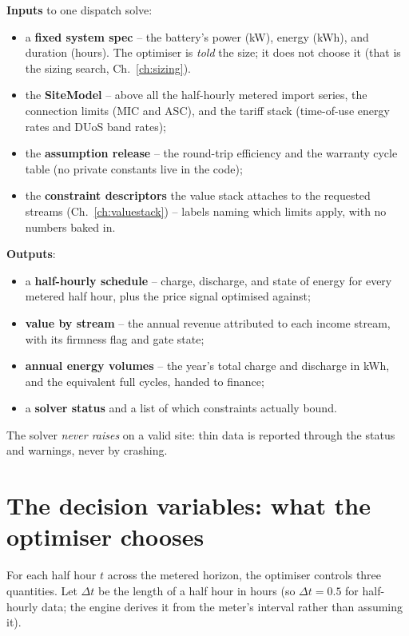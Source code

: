 \begin{contract}
\textbf{Inputs} to one dispatch solve:
\begin{itemize}
  \item a \textbf{fixed system spec} -- the battery's power (kW), energy (kWh), and duration (hours). The optimiser is \emph{told} the size; it does not choose it (that is the sizing search, Ch.~\ref{ch:sizing}).
  \item the \textbf{SiteModel} -- above all the half-hourly metered import series, the connection limits (MIC and ASC), and the tariff stack (time-of-use energy rates and DUoS band rates);
  \item the \textbf{assumption release} -- the round-trip efficiency and the warranty cycle table (no private constants live in the code);
  \item the \textbf{constraint descriptors} the value stack attaches to the requested streams (Ch.~\ref{ch:valuestack}) -- labels naming which limits apply, with no numbers baked in.
\end{itemize}
\textbf{Outputs}:
\begin{itemize}
  \item a \textbf{half-hourly schedule} -- charge, discharge, and state of energy for every metered half hour, plus the price signal optimised against;
  \item \textbf{value by stream} -- the annual revenue attributed to each income stream, with its firmness flag and gate state;
  \item \textbf{annual energy volumes} -- the year's total charge and discharge in kWh, and the equivalent full cycles, handed to finance;
  \item a \textbf{solver status} and a list of which constraints actually bound.
\end{itemize}
The solver \emph{never raises} on a valid site: thin data is reported through the status and warnings, never by crashing.
\end{contract}

\section{The decision variables: what the optimiser chooses}

For each half hour $t$ across the metered horizon, the optimiser controls three quantities. Let $\Delta t$ be the length of a half hour in hours (so $\Delta t = 0.5$ for half-hourly data; the engine derives it from the meter's interval rather than assuming it).

